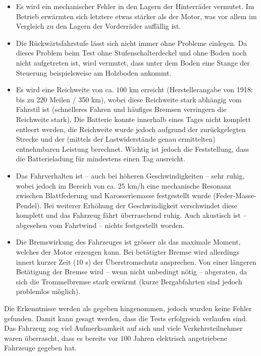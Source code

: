 \begin{itemize}
	\item Es wird ein mechanischer Fehler in den Lagern der Hinterräder vermutet. Im Betrieb erwärmten sich letztere etwas stärker als der Motor, was vor allem im Vergleich zu den Lagern der Vorderräder auffällig ist.
	\item Die Rückwärtsfahrstufe lässt sich nicht immer ohne Probleme einlegen. Da dieses Problem beim Test ohne Stufenschalterdeckel und ohne Boden noch nicht aufgetreten ist, wird vermutet, dass unter dem Boden eine Stange der Steuerung beispielsweise am Holzboden ankommt.
	\item Es wird eine Reichweite von ca. $100$ km erreicht (Herstellerangabe von 1918: bis zu 220 Meilen / 350 km), wobei diese Reichweite stark abhängig vom Fahrstil ist (schnelleres Fahren und häufiges Bremsen verringern die Reichweite stark). Die Batterie konnte innerhalb eines Tages nicht komplett entleert werden, die Reichweite wurde jedoch aufgrund der zurückgelegten Strecke und der (mittels der Lastwiderstände genau ermittelten) entnehmbaren Leistung berechnet. Wichtig ist jedoch die Feststellung, dass die Batterieladung für mindestens einen Tag ausreicht.
	\item Das Fahrverhalten ist -- auch bei höheren Geschwindigkeiten -- sehr ruhig, wobei jedoch im Bereich von ca. $25$ km/h eine mechanische Resonanz zwischen Blattfederung und Karosseriemasse festgestellt wurde (Feder-Masse-Pendel). Bei weiterer Erhöhung der Geschwindigkeit verschwindet diese komplett und das Fahrzeug fährt überraschend ruhig. Auch akustisch ist -- abgesehen vom Fahrtwind -- nichts festgestellt worden.
	\item Die Bremswirkung des Fahrzeuges ist grösser als das maximale Moment, welches der Motor erzeugen kann. Bei betätigter Bremse wird allerdings innert kurzer Zeit ($10$ s) der Überstromschutz ansprechen. Von einer längeren Betätigung der Bremse wird -- wenn nicht unbedingt nötig -- abgeraten, da sich die Trommelbremse stark erwärmt (kurze Bergabfahrten sind jedoch problemlos möglich).
\end{itemize}

Die Erkenntnisse werden als gegeben hingenommen, jedoch wurden keine Fehler gefunden. Damit kann gesagt werden, dass die Tests erfolgreich verlaufen sind. Das Fahrzeug zog viel Aufmerksamkeit auf sich und viele Verkehrsteilnehmer waren überrascht, dass es bereits vor 100 Jahren elektrisch angetriebene Fahrzeuge gegeben hat.

\newpage
\color{black}